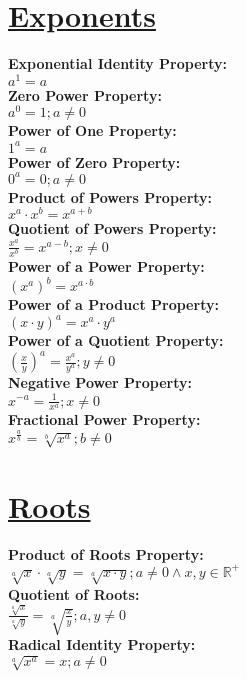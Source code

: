 \documentclass[12pt]{article}
\begin{document}
\section*{\underline{\textbf{Exponents}}}
\textbf{Exponential Identity Property:}
    \\ \( a^1 = a \)
\\ \textbf{Zero Power Property:}
    \\ \( a^0 = 1 ; a \ne 0 \)
\\ \textbf{Power of One Property:}
    \\ \( 1^a = a \)
\\ \textbf{Power of Zero Property:}
    \\ \( 0^a = 0 ; a \ne 0 \)
\\ \textbf{Product of Powers Property:}
    \\ \( x^a \cdot x^b = x^{a + b} \)
\\ \textbf{Quotient of Powers Property:}
    \\ \( \displaystyle\frac{ x^a }{ x^b } = x^{a - b} ; x \ne 0 \)
\\ \textbf{Power of a Power Property:}
    \\ \( (x^a)^b = x^{a \cdot b} \)
\\ \textbf{Power of a Product Property:}
    \\ \( (x \cdot y)^a = x^a \cdot y^a \)
\\ \textbf{Power of a Quotient Property:}
    \\ \( \left( \displaystyle\frac{ x }{ y } \right)^a = \frac{ x^a }{ y^a } ; y \ne 0 \)
\\ \textbf{Negative Power Property:}
    \\ \( x^{-a} = \frac{ 1 }{ x^a } ; x \ne 0 \)
\\ \textbf{Fractional Power Property:}
    \\ \( x^{\frac{ a }{ b }} = \displaystyle\sqrt[b]{x^a} ; b \ne 0 \)



\section*{\underline{\textbf{Roots}}}
\textbf{Product of Roots Property:}
    \\ \( \displaystyle\sqrt[a]{x} \cdot \displaystyle\sqrt[a]{y} = \displaystyle\sqrt[a]{x \cdot y} ; a \ne 0 \land x, y \in \mathbb{R}^+ \)
\\ \textbf{Quotient of Roots:}
    \\ \( \displaystyle\frac{ \displaystyle\sqrt[a]{x} }{ \displaystyle\sqrt[a]{y} } = \displaystyle\sqrt[a]{\displaystyle\frac{ x }{ y }} ; a, y \ne 0 \)
\\ \textbf{Radical Identity Property:}
    \\ \( \displaystyle\sqrt[a]{x^a} = x ; a \ne 0 \)
\end{document}
